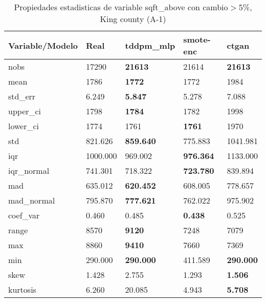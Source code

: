 \begin{table}[H]
\centering
\fontsize{8}{14}\selectfont
\caption{Propiedades estadisticas de variable sqft\_above con cambio\ensuremath{>}5\%, King county (A-1)}
\label{table-stats-king county-a-1-sqft_above-short}
\begin{tabular}{|l|m{10em}|m{10em}|m{10em}|m{10em}|}
\hline
 \rowcolor[gray]{0.8}
Variable/Modelo & Real & tddpm\_mlp & smote-enc & ctgan \\
\hline nobs & 17290 & \bfseries 21613 & \cellcolor[rgb]{0.9, 0.54, 0.52} 21614 & \bfseries 21613 \\
\hline mean & 1786 & \bfseries 1772 & 1772 & \cellcolor[rgb]{0.9, 0.54, 0.52} 1984 \\
\hline std\_err & 6.249 & \bfseries 5.847 & \cellcolor[rgb]{0.9, 0.54, 0.52} 5.278 & 7.088 \\
\hline upper\_ci & 1798 & \bfseries 1784 & 1782 & \cellcolor[rgb]{0.9, 0.54, 0.52} 1998 \\
\hline lower\_ci & 1774 & 1761 & \bfseries 1761 & \cellcolor[rgb]{0.9, 0.54, 0.52} 1970 \\
\hline std & 821.626 & \bfseries 859.640 & 775.883 & \cellcolor[rgb]{0.9, 0.54, 0.52} 1041.981 \\
\hline iqr & 1000.000 & 969.002 & \bfseries 976.364 & \cellcolor[rgb]{0.9, 0.54, 0.52} 1133.000 \\
\hline iqr\_normal & 741.301 & 718.322 & \bfseries 723.780 & \cellcolor[rgb]{0.9, 0.54, 0.52} 839.894 \\
\hline mad & 635.012 & \bfseries 620.452 & 608.005 & \cellcolor[rgb]{0.9, 0.54, 0.52} 778.657 \\
\hline mad\_normal & 795.870 & \bfseries 777.621 & 762.022 & \cellcolor[rgb]{0.9, 0.54, 0.52} 975.902 \\
\hline coef\_var & 0.460 & 0.485 & \bfseries 0.438 & \cellcolor[rgb]{0.9, 0.54, 0.52} 0.525 \\
\hline range & 8570 & \bfseries 9120 & 7248 & \cellcolor[rgb]{0.9, 0.54, 0.52} 7079 \\
\hline max & 8860 & \bfseries 9410 & 7660 & \cellcolor[rgb]{0.9, 0.54, 0.52} 7369 \\
\hline min & 290.000 & \bfseries 290.000 & \cellcolor[rgb]{0.9, 0.54, 0.52} 411.589 & \bfseries 290.000 \\
\hline skew & 1.428 & \cellcolor[rgb]{0.9, 0.54, 0.52} 2.755 & 1.293 & \bfseries 1.506 \\
\hline kurtosis & 6.260 & \cellcolor[rgb]{0.9, 0.54, 0.52} 20.085 & 4.943 & \bfseries 5.708 \\

\end{tabular}
\end{table}
